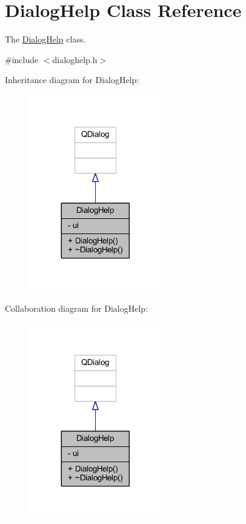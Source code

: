 \hypertarget{class_dialog_help}{\section{Dialog\+Help Class Reference}
\label{class_dialog_help}
}


The \hyperlink{class_dialog_help}{Dialog\+Help} class.  




{\ttfamily \#include $<$dialoghelp.\+h$>$}



Inheritance diagram for Dialog\+Help\+:
\nopagebreak
\begin{figure}[H]
\begin{center}
\leavevmode
\includegraphics[width=164pt]{class_dialog_help__inherit__graph}
\end{center}
\end{figure}


Collaboration diagram for Dialog\+Help\+:
\nopagebreak
\begin{figure}[H]
\begin{center}
\leavevmode
\includegraphics[width=164pt]{class_dialog_help__coll__graph}
\end{center}
\end{figure}
